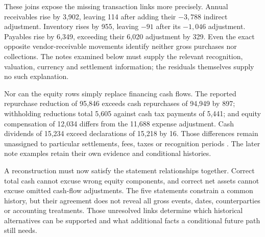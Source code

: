 These joins expose the missing transaction links more precisely. Annual
receivables rise by 3,902, leaving 114 after adding their $-3{,}788$ indirect
adjustment. Inventory rises by 955, leaving $-91$ after its $-1{,}046$
adjustment. Payables rise by 6,349, exceeding their 6,020 adjustment by 329.
Even the exact opposite vendor-receivable movements identify neither gross
purchases nor collections. The notes examined below must supply the relevant
recognition, valuation, currency and settlement information; the residuals
themselves supply no such explanation.

Nor can the equity rows simply replace financing cash flows. The reported
repurchase reduction of 95,846 exceeds cash repurchases of 94,949 by 897;
withholding reductions total 5,605 against cash tax payments of 5,441; and
equity compensation of 12,034 differs from the 11,688 expense adjustment.
Cash dividends of 15,234 exceed declarations of 15,218 by 16. Those
differences remain unassigned to particular settlements, fees, taxes or
recognition periods \citep[printed pp.~32--33]{apple2024}. The later note
examples retain their own evidence and conditional histories.

A reconstruction must now satisfy the statement relationships together.
Correct total cash cannot excuse wrong equity components, and correct net
assets cannot excuse omitted cash-flow adjustments. The five statements
constrain a common history, but their agreement does not reveal all gross
events, dates, counterparties or accounting treatments. Those unresolved
links determine which historical alternatives can be supported and what
additional facts a conditional future path still needs.
